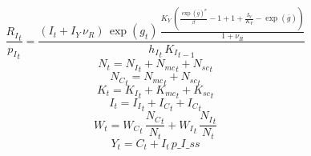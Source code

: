 \begin{dmath}
\frac{{{R_I}}_{t}}{{{p_I}}_{t}}=\frac{\left({{I}}_{t}+{{I_Y}}\, {{\nu_R}}\right)\, \exp\left({{g}}_{t}\right)\, \frac{{{K_Y}}\, \left(\frac{\exp\left({{\overline{g}}}\right)^{{{\sigma}}}}{{{\beta}}}-1+1+\frac{{{I_Y}}}{{{K_Y}}}-\exp\left({{\overline{g}}}\right)\right)}{1+{{\nu_R}}}}{{{h_I}}_{t}\, {{K_I}}_{t-1}}
\end{dmath}
\begin{dmath}
{{N}}_{t}={{N_I}}_{t}+{{N_{mc}}}_{t}+{{N_{sc}}}_{t}
\end{dmath}
\begin{dmath}
{{N_C}}_{t}={{N_{mc}}}_{t}+{{N_{sc}}}_{t}
\end{dmath}
\begin{dmath}
{{K}}_{t}={{K_I}}_{t}+{{K_{mc}}}_{t}+{{K_{sc}}}_{t}
\end{dmath}
\begin{dmath}
{{I}}_{t}={{I_I}}_{t}+{{I_C}}_{t}+{{I_C}}_{t}
\end{dmath}
\begin{dmath}
{{W}}_{t}={{W_C}}_{t}\, \frac{{{N_C}}_{t}}{{{N}}_{t}}+{{W_I}}_{t}\, \frac{{{N_I}}_{t}}{{{N}}_{t}}
\end{dmath}
\begin{dmath}
{{Y}}_{t}={{C}}_{t}+{{I}}_{t}\, {p\_I\_ss}
\end{dmath}
